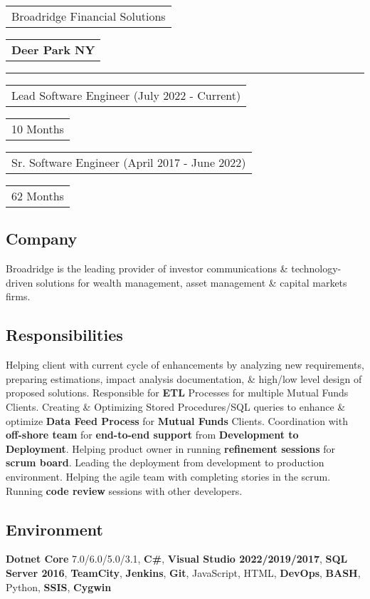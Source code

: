 \documentclass[letterpaper,11pt]{article}
\begin{document}
    \noindent
    \begin{tabular}[t]{@{}l}
    \Large{Broadridge Financial Solutions}
    \end{tabular}
    \hfill
    \begin{tabular}[t]{l@{}}
    \textbf{Deer Park NY}
    \end{tabular}
    \noindent\rule{\textwidth}{0.5pt}
    \begin{tabular}[t]{@{}l}
    Lead Software Engineer (July 2022 - Current)
    \end{tabular}
    \hfill
    \begin{tabular}[t]{l@{}}
    10 Months
    \end{tabular}
    \begin{tabular}[t]{@{}l}
    Sr. Software Engineer (April 2017 - June 2022)
    \end{tabular}
    \hfill
    \begin{tabular}[t]{l@{}}
    62 Months
    \end{tabular}

    \subsection{Company}
    Broadridge is the leading provider of investor communications \& technology-driven solutions for wealth management, asset management \& capital markets firms.

    \subsection{Responsibilities}
    Helping client with current cycle of enhancements by analyzing new requirements, preparing estimations, impact analysis documentation, \& high/low level design of proposed solutions. Responsible for \textbf{ETL} Processes for multiple Mutual Funds Clients. Creating \& Optimizing Stored Procedures/SQL queries to enhance \& optimize \textbf{Data Feed Process} for \textbf{Mutual Funds} Clients. Coordination with \textbf{off-shore team} for \textbf{end-to-end support} from \textbf{Development to Deployment}. Helping product owner in running \textbf{refinement sessions} for \textbf{scrum board}. Leading the deployment from development to production environment. Helping the agile team with completing stories in the scrum. Running \textbf{code review} sessions with other developers.


    \subsection{Environment}
    \textbf{Dotnet Core} 7.0/6.0/5.0/3.1, \textbf{C\#}, \textbf{Visual Studio 2022/2019/2017}, \textbf{SQL Server 2016}, \textbf{TeamCity}, \textbf{Jenkins}, \textbf{Git}, JavaScript, HTML, \textbf{DevOps}, \textbf{BASH}, Python, \textbf{SSIS}, \textbf{Cygwin}
\end{document}
